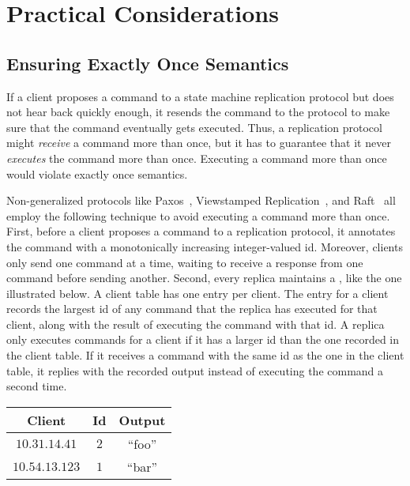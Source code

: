 \section{Practical Considerations}

\subsection{Ensuring Exactly Once Semantics}
If a client proposes a command to a state machine replication protocol but
does not hear back quickly enough, it resends the command to the protocol to
make sure that the command eventually gets executed. Thus, a replication
protocol might \emph{receive} a command more than once, but it has to guarantee
that it never \emph{executes} the command more than once. Executing a command
more than once would violate exactly once semantics.

Non-generalized protocols like Paxos~\cite{van2015paxos}, Viewstamped
Replication~\cite{liskov2012viewstamped}, and Raft~\cite{ongaro2014search} all
employ the following technique to avoid executing a command more than once.
First, before a client proposes a command to a replication protocol, it
annotates the command with a monotonically increasing integer-valued id.
Moreover, clients only send one command at a time, waiting to receive a
response from one command before sending another. Second, every replica
maintains a , like the one illustrated below. A client
table has one entry per client. The entry for a client records the largest id
of any command that the replica has executed for that client, along with the
result of executing the command with that id. A replica only executes commands
for a client if it has a larger id than the one recorded in the client table.
If it receives a command with the same id as the one in the client table, it
replies with the recorded output instead of executing the command a second
time.

\begin{center}
  \begin{tabular}{|c|c|c|}
    \hline
    \textbf{Client} & \textbf{Id} & \textbf{Output} \\\hline
    $10.31.14.41$   & $2$         & ``foo'' \\
    $10.54.13.123$  & $1$         & ``bar'' \\\hline
  \end{tabular}
\end{center}

